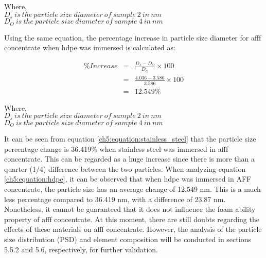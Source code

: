 \begin{doublespace}
Where, \\
$D_s\ is\ the\ particle\ size\ diameter\ of\ sample\ 2\ in\ nm$ \\
$D_O\ is\ the\ particle\ size\ diameter\ of\ sample\ 4\ in\ nm$ \\
\end{doublespace}

Using the same equation, the percentage increase in particle size diameter for \acrshort{afff} concentrate when \acrshort{hdpe} was immersed is calculated as:  

\begin{doublespace}
\begin{eqnarray}
    \%Increase &=& \frac{D_s - D_O}{D_O} \times 100 \\ 
    \nonumber &=& \frac{4.036 - 3.586}{3.586}\times 100 \\
    \nonumber &=& 12.549\% 
    \label{ch5:equation:hdpe}
\end{eqnarray}
\end{doublespace}
 
\begin{doublespace}
Where, \\
$D_s\ is\ the\ particle\ size\ diameter\ of\ sample\ 2\ in\ nm$ \\
$D_O\ is\ the\ particle\ size\ diameter\ of\ sample\ 4\ in\ nm$ \\
\end{doublespace}

It can be seen from equation \ref{ch5:equation:stainless_steel} that the particle size percentage change is 36.419\% when stainless steel was immersed in \acrshort{afff} concentrate. This can be regarded as a huge increase since there is more than a quarter (1/4) difference between the two particles. When analyzing equation \ref{ch5:equation:hdpe}, it can be observed that when \acrshort{hdpe} was immersed in AFF concentrate, the particle size has an average change of 12.549 nm. This is a much less percentage compared to 36.419 nm, with a difference of 23.87 nm. Nonetheless, it cannot be guaranteed that it does not influence the foam ability property of \acrshort{afff} concentrate.  At this moment, there are still doubts regarding the effects of these materials on \acrshort{afff} concentrate. However, the analysis of the particle size distribution (PSD) and element composition will be conducted in sections 5.5.2 and 5.6, respectively, for further validation.

